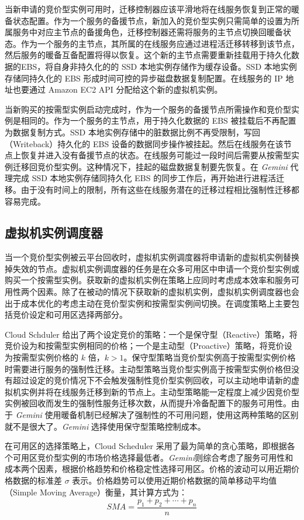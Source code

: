 当新申请的竞价型实例可用时，迁移控制器应该平滑地将在线服务恢复到正常的暖备状态配置。作为一个服务的备援节点，新加入的竞价型实例只需简单的设置为所属服务中对应主节点的备援角色，迁移控制器还需将服务的主节点切换回暖备状态。作为一个服务的主节点，其所属的在线服务应通过进程活迁移转移到该节点，然后服务的暖备互备配置将得以恢复。这个新的主节点需要重新挂载用于持久化数据的EBS，将自身非持久化的的 SSD 本地实例存储作为缓存设备。SSD 本地实例存储同持久化的 EBS 形成时间可控的异步磁盘数据复制配置。在线服务的 IP 地址也要通过 Amazon EC2 API 分配给这个新的虚拟机实例。

当新购买的按需型实例启动完成时，作为一个服务的备援节点所需操作和竞价型实例是相同的。作为一个服务的主节点，用于持久化数据的 EBS 被挂载后不再配置为数据复制方式。SSD 本地实例存储中的脏数据比例不再受限制，写回（Writeback）持久化的 EBS 设备的数据同步操作被挂起。然后在线服务在该节点上恢复并进入没有备援节点的状态。在线服务可能过一段时间后需要从按需型实例迁移回竞价型实例。这种情况下，挂起的磁盘数据复制要先恢复。在 \emph{Gemini} 代理完成 SSD 本地实例存储同持久化 EBS 的同步工作后，再开始进行进程活迁移。由于没有时间上的限制，所有这些在线服务潜在的迁移过程相比强制性迁移都容易完成。

\subsection{虚拟机实例调度器}
当一个竞价型实例被云平台回收时，虚拟机实例调度器将申请新的虚拟机实例替换掉失效的节点。虚拟机实例调度器的任务是在众多可用区中申请一个竞价型实例或购买一个按需型实例。获取新的虚拟机实例在策略上应同时考虑成本效率和服务可用性两个因素。除了在被动的情况下获取新的虚拟机实例，虚拟机实例调度器也会出于成本优化的考虑主动在竞价型实例和按需型实例间切换。在调度策略上主要包括竞价设定和可用区选择两部分。

Cloud Schduler \cite{He:2015:CCH:2749246.2749275} 给出了两个设定竞价的策略：一个是保守型（Reactive）策略，将竞价设为和按需型实例相同的价格；一个是主动型（Proactive）策略，将竞价设为按需型实例价格的 $k$ 倍，$k > 1$。保守型策略当竞价型实例高于按需型实例价格时需要进行服务的强制性迁移。主动型策略当竞价型实例高于按需型实例价格但没有超过设定的竞价情况下不会触发强制性竞价型实例回收，可以主动地申请新的虚拟机实例并将在线服务迁移到新的节点上。主动型策略能一定程度上减少因竞价型实例被回收而发生的强制性服务迁移次数，从而提升冷备配置下的服务可用性。由于 \emph{Gemini} 使用暖备机制已经解决了强制性的不可用问题，使用这两种策略的区别就不是很大了。\emph{Gemini} 选择使用保守型策略控制成本。

在可用区的选择策略上，Cloud Scheduler 采用了最为简单的贪心策略，即根据各个可用区竞价型实例的市场价格选择最低者。\emph{Gemini}则综合考虑了服务可用性和成本两个因素，根据价格趋势和价格稳定性选择可用区。价格的波动可以用近期价格数据的标准差 $\sigma$ 表示。价格趋势可以使用近期价格数据的简单移动平均值（Simple Moving Average）衡量，其计算方式为：
\begin{equation}
SMA = \frac{p_1 + p_2 + \cdots + p_n}{n}
\end{equation}

